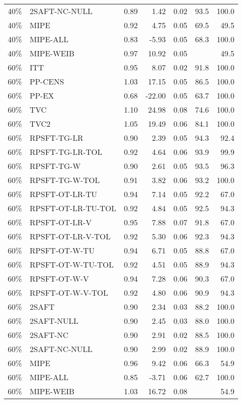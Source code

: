 \begin{table}[ht]
{\begin{tabular}{llrrrrr}
  40\% & 2SAFT-NC-NULL & 0.89 & 1.42 & 0.02 & 93.5 & 100.0 \\ 
  40\% & MIPE & 0.92 & 4.75 & 0.05 & 69.5 & 49.5 \\ 
  40\% & MIPE-ALL & 0.83 & -5.93 & 0.05 & 68.3 & 100.0 \\ 
  40\% & MIPE-WEIB & 0.97 & 10.92 & 0.05 &  & 49.5 \\ 
   \hline
60\% & ITT & 0.95 & 8.07 & 0.02 & 91.8 & 100.0 \\ 
  60\% & PP-CENS & 1.03 & 17.15 & 0.05 & 86.5 & 100.0 \\ 
  60\% & PP-EX & 0.68 & -22.00 & 0.05 & 63.7 & 100.0 \\ 
  60\% & TVC & 1.10 & 24.98 & 0.08 & 74.6 & 100.0 \\ 
  60\% & TVC2 & 1.05 & 19.49 & 0.06 & 84.1 & 100.0 \\ 
   \hline
60\% & RPSFT-TG-LR & 0.90 & 2.39 & 0.05 & 94.3 & 92.4 \\ 
  60\% & RPSFT-TG-LR-TOL & 0.92 & 4.64 & 0.06 & 93.9 & 99.9 \\ 
  60\% & RPSFT-TG-W & 0.90 & 2.61 & 0.05 & 93.5 & 96.3 \\ 
  60\% & RPSFT-TG-W-TOL & 0.91 & 3.82 & 0.06 & 93.2 & 100.0 \\ 
  60\% & RPSFT-OT-LR-TU & 0.94 & 7.14 & 0.05 & 92.2 & 67.0 \\ 
  60\% & RPSFT-OT-LR-TU-TOL & 0.92 & 4.84 & 0.05 & 92.5 & 94.3 \\ 
  60\% & RPSFT-OT-LR-V & 0.95 & 7.88 & 0.07 & 91.8 & 67.0 \\ 
  60\% & RPSFT-OT-LR-V-TOL & 0.92 & 5.30 & 0.06 & 92.3 & 94.3 \\ 
   \hline
60\% & RPSFT-OT-W-TU & 0.94 & 6.71 & 0.05 & 88.8 & 67.0 \\ 
  60\% & RPSFT-OT-W-TU-TOL & 0.92 & 4.51 & 0.05 & 88.9 & 94.3 \\ 
  60\% & RPSFT-OT-W-V & 0.94 & 7.28 & 0.06 & 90.3 & 67.0 \\ 
  60\% & RPSFT-OT-W-V-TOL & 0.92 & 4.80 & 0.06 & 90.9 & 94.3 \\ 
   \hline
60\% & 2SAFT & 0.90 & 2.34 & 0.03 & 88.2 & 100.0 \\ 
  60\% & 2SAFT-NULL & 0.90 & 2.45 & 0.03 & 88.0 & 100.0 \\ 
  60\% & 2SAFT-NC & 0.90 & 2.91 & 0.02 & 88.5 & 100.0 \\ 
  60\% & 2SAFT-NC-NULL & 0.90 & 2.99 & 0.02 & 88.9 & 100.0 \\ 
  60\% & MIPE & 0.96 & 9.42 & 0.06 & 66.3 & 54.9 \\ 
  60\% & MIPE-ALL & 0.85 & -3.71 & 0.06 & 62.7 & 100.0 \\ 
  60\% & MIPE-WEIB & 1.03 & 16.72 & 0.08 &  & 54.9 \\ 
   \hline
\end{tabular}
}
\end{table}
